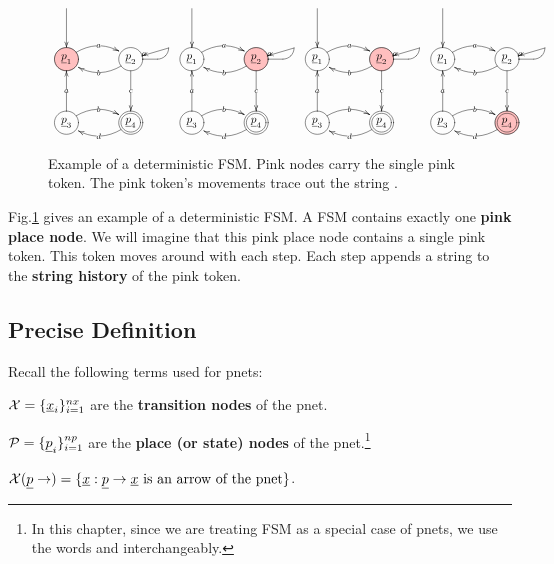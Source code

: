 \begin{figure}[h!]
$$
\begin{array}{cccc}
\xymatrix@C=3pc@R=3pc{
\ar[d] 
\\
\PinkCircle{\rvp_1}\ar@/^1pc/[r]|a
&
\Circle{\rvp_2}\ar@/^1pc/[l]|b
\ar[d]|c \loopup{4}{^a}
\\
\Circle{\rvp_3}\ar@/^1pc/[r]|b
\ar[u]|a
&\DCircle{\rvp_4}\ar@/^1pc/[l]|d
}&
\xymatrix@C=3pc@R=3pc{
\ar[d] 
\\
\Circle{\rvp_1}\ar@/^1pc/[r]|a
&
\PinkCircle{\rvp_2}\ar@/^1pc/[l]|b
\ar[d]|c \loopup{4}{^a}
\\
\Circle{\rvp_3}\ar@/^1pc/[r]|b
\ar[u]|a
&\DCircle{\rvp_4}\ar@/^1pc/[l]|d
}&
\xymatrix@C=3pc@R=3pc{
\ar[d] 
\\
\Circle{\rvp_1}\ar@/^1pc/[r]|a
&
\PinkCircle{\rvp_2}\ar@/^1pc/[l]|b
\ar[d]|c \loopup{4}{^a}
\\
\Circle{\rvp_3}\ar@/^1pc/[r]|b
\ar[u]|a
&\DCircle{\rvp_4}\ar@/^1pc/[l]|d
}&
\xymatrix@C=3pc@R=3pc{
\ar[d] 
\\
\Circle{\rvp_1}\ar@/^1pc/[r]|a
&
\Circle{\rvp_2}\ar@/^1pc/[l]|b
\ar[d]|c \loopup{4}{^a}
\\
\Circle{\rvp_3}\ar@/^1pc/[r]|b
\ar[u]|a
&\PinkDCircle{\rvp_4}\ar@/^1pc/[l]|d
}
\end{array}
$$
\caption{Example of a deterministic FSM. Pink nodes carry the single pink token.
The pink token's movements trace out the string .}
\label{fig-det-fsm}
\end{figure}
Fig.\ref{fig-det-fsm}
gives an example of a deterministic
FSM. A FSM contains exactly one {\bf pink place node}. We will 
imagine that this pink place node contains a single pink token. This token moves around with each step.
Each step appends a string to the {\bf string history} of the pink token.

\subsection{Precise Definition}

Recall the following terms used for pnets:

$\calx =\{\rvx_i\}_{i=1}^{nx}$ are the {\bf transition nodes} of the pnet.

$\calp =\{\rvp_i\}_{i=1}^{np}$ are the {\bf place (or state) nodes} of the pnet.\footnote{In this
chapter, since we are treating FSM as a special case of pnets, we use the words  and
 interchangeably.}

$\calx(\rvp\rarrow)=\{\rvx: \rvp\rarrow\rvx \text{ is an arrow of the pnet}\}$.

